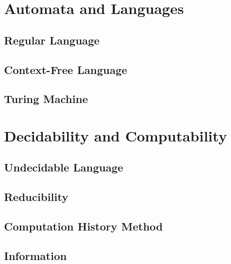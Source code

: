 \documentclass[11pt,fleqn,dvipsnames]{book} %
\begin{document}
\pagestyle{fancy} %

\setlength{\parskip}{1em}

\part{Automata and Languages}

\chapter{Regular Language}


\chapter{Context-Free Language}


\chapter{Turing Machine}


\part{Decidability and Computability}

\chapter{Undecidable Language}


\chapter{Reducibility}


\chapter{Computation History Method}


\chapter{Information}

\end{document}
